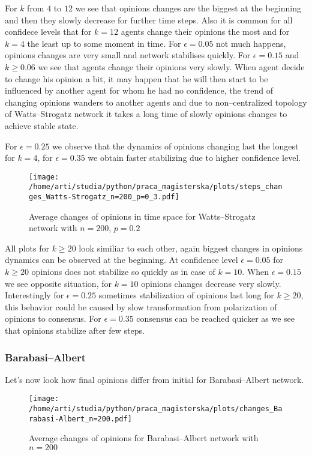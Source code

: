 \documentclass{article}
\begin{document}
For $k$ from $4$ to $12$ we see that opinions changes are the biggest at the beginning and then they slowly decrease for further time steps. Also it is common for all confidece levels that for $k=12$ agents change their opinions the most and for $k=4$ the least up to some moment in time. For $\epsilon=0.05$ not much happens, opinions changes are very small and network stabilises quickly. For $\epsilon=0.15$ and $k \geq 0.06$ we see that agents change their opinions very slowly. When agent decide to change his opinion a bit, it may happen that he will then start to be influenced by another agent for whom he had no confidence, the trend of changing opinions wanders to another agents and due to non--centralized topology of Watts--Strogatz network it takes a long time of slowly opinions changes to achieve stable state.
\indent

For $\epsilon=0.25$ we observe that the dynamics of opinions changing last the longest for $k=4$, for $\epsilon=0.35$ we obtain faster stabilizing due to higher confidence level.

\begin{figure}[H]
		\centering
		\texttt{[image: /home/arti/studia/python/praca\_magisterska/plots/steps\_changes\_Watts-Strogatz\_n=200\_p=0\_3.pdf]}
		\caption{Average changes of opinions in time space for Watts--Strogatz network with $n=200$, $p=0.2$}
\end{figure}

All plots for $k \geq 20$ look similiar to each other, again biggest changes in opinions dynamics can be observed at the beginning. At confidence level $\epsilon=0.05$ for $k \geq 20$ opinions does not stabilize so quickly as in case of $k=10$. When $\epsilon=0.15$ we see opposite situation, for $k=10$ opinions changes decrease very slowly. Interestingly for $\epsilon=0.25$ sometimes stabilization of opinions last long for $k \geq 20$, this behavior could be caused by slow transformation from polarization of opinions to consensus. For $\epsilon=0.35$ consensus can be reached quicker as we see that opinions stabilize after few steps.

\subsubsection{Barabasi--Albert}

Let's now look how final opinions differ from initial for Barabasi--Albert network.

\begin{figure}[H]
		\centering
		\texttt{[image: /home/arti/studia/python/praca\_magisterska/plots/changes\_Barabasi-Albert\_n=200.pdf]}
		\caption{Average changes of opinions for Barabasi--Albert network with $n=200$}
\end{figure}
\end{document}
